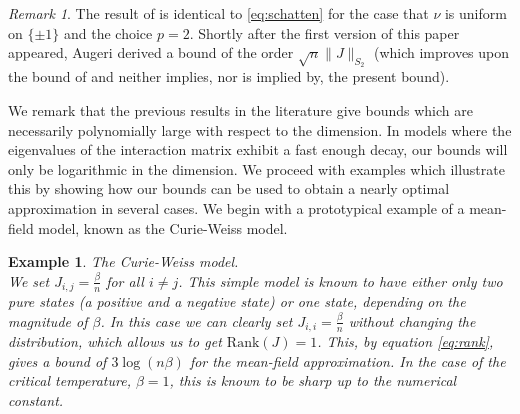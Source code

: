 \documentclass[12pt]{article}
\newtheorem{example}{Example}
\theoremstyle{definition}
\theoremstyle{remark}
\newtheorem{remark}{Remark}
\begin{document}
\begin{remark}
The result of \cite{JKR18} is identical to \eqref{eq:schatten} for the case that $\nu$ is uniform on $\{\pm 1\}$ and the choice $p=2$. Shortly after the first version of this paper appeared, Augeri \cite{Aug19} derived a bound of the order $\sqrt{n} \|J\|_{S_2}$ (which improves upon the bound of \cite{JKR18} and neither implies, nor is implied by, the present bound).
\end{remark}

We remark that the previous results in the literature give bounds which are necessarily polynomially large with respect to the dimension. In models where the eigenvalues of the interaction matrix exhibit a fast enough decay, our bounds will only be logarithmic in the dimension. We proceed with examples which illustrate this by showing how our bounds can be used to obtain a nearly optimal approximation in several cases. We begin with a prototypical example of a mean-field model, known as the Curie-Weiss model.

\begin{example} \emph{The Curie-Weiss model.} \\
We set $J_{i,j} = \frac{\beta}{n}$ for all $i \neq j$. This simple model is known to have either only two pure states (a positive and a negative state) or one state, depending on the magnitude of $\beta$. In this case we can clearly set $J_{i,i} = \frac{\beta}{n}$ without changing the distribution, which allows us to get $\mathrm{Rank}(J) = 1$. This, by equation \eqref{eq:rank}, gives a bound of $3 \log(n \beta)$ for the mean-field approximation. In the case of the critical temperature, $\beta=1$, this is known to be sharp up to the numerical constant.
\end{example}
\end{document}
